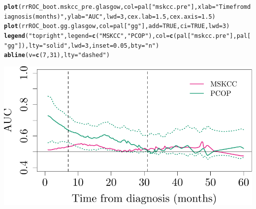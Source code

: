 \documentclass{article}\usepackage[]{graphicx}\usepackage[]{color}
\makeatletter
\def\maxwidth{ %
  \ifdim\Gin@nat@width>\linewidth
    \linewidth
  \else
    \Gin@nat@width
  \fi
}
\newcommand{\hlnum}[1]{\textcolor[rgb]{0.686,0.059,0.569}{#1}}%
\newcommand{\hlstr}[1]{\textcolor[rgb]{0.192,0.494,0.8}{#1}}%
\newcommand{\hlstd}[1]{\textcolor[rgb]{0.345,0.345,0.345}{#1}}%
\newcommand{\hlkwc}[1]{\textcolor[rgb]{0.333,0.667,0.333}{#1}}%
\newcommand{\hlkwd}[1]{\textcolor[rgb]{0.737,0.353,0.396}{\textbf{#1}}}%
\newenvironment{kframe}{%
 \def\at@end@of@kframe{}%
 \ifinner\ifhmode%
  \def\at@end@of@kframe{\end{minipage}}%
  \begin{minipage}{\columnwidth}%
 \fi\fi%
 \def\FrameCommand##1{\hskip\@totalleftmargin \hskip-\fboxsep
 \colorbox{shadecolor}{##1}\hskip-\fboxsep
     \hskip-\linewidth \hskip-\@totalleftmargin \hskip\columnwidth}%
 \MakeFramed {\advance\hsize-\width
   \@totalleftmargin\z@ \linewidth\hsize
   \@setminipage}}%
 {\par\unskip\endMakeFramed%
 \at@end@of@kframe}
\newenvironment{knitrout}{}{} %
\makeatother
\begin{document}
\begin{knitrout}
\color{fgcolor}\begin{kframe}
\begin{alltt}
\hlkwd{plot}\hlstd{(rrROC_boot.mskcc_pre.glasgow,} \hlkwc{col} \hlstd{= pal[}\hlstr{"mskcc.pre"}\hlstd{],} \hlkwc{xlab} \hlstd{=} \hlstr{"Time from diagnosis (months)"}\hlstd{,} \hlkwc{ylab} \hlstd{=} \hlstr{"AUC"}\hlstd{,} \hlkwc{lwd} \hlstd{=} \hlnum{3}\hlstd{,} \hlkwc{cex.lab} \hlstd{=} \hlnum{1.5}\hlstd{,} \hlkwc{cex.axis} \hlstd{=} \hlnum{1.5}\hlstd{)}
\hlkwd{plot}\hlstd{(rrROC_boot.gg.glasgow,} \hlkwc{col} \hlstd{= pal[}\hlstr{"gg"}\hlstd{],} \hlkwc{add} \hlstd{=} \hlnum{TRUE}\hlstd{,} \hlkwc{ci} \hlstd{=} \hlnum{TRUE}\hlstd{,} \hlkwc{lwd} \hlstd{=} \hlnum{3}\hlstd{)}
\hlkwd{legend}\hlstd{(}\hlstr{"topright"}\hlstd{,} \hlkwc{legend} \hlstd{=} \hlkwd{c}\hlstd{(}\hlstr{"MSKCC"}\hlstd{,} \hlstr{"PCOP"}\hlstd{),} \hlkwc{col} \hlstd{=} \hlkwd{c}\hlstd{(pal[}\hlstr{"mskcc.pre"}\hlstd{], pal[}\hlstr{"gg"}\hlstd{]),} \hlkwc{lty} \hlstd{=} \hlstr{"solid"}\hlstd{,} \hlkwc{lwd} \hlstd{=} \hlnum{3}\hlstd{,} \hlkwc{inset} \hlstd{=} \hlnum{0.05}\hlstd{,} \hlkwc{bty} \hlstd{=} \hlstr{"n"}\hlstd{)}
\hlkwd{abline}\hlstd{(}\hlkwc{v} \hlstd{=} \hlkwd{c}\hlstd{(}\hlnum{7}\hlstd{,} \hlnum{31}\hlstd{),} \hlkwc{lty} \hlstd{=} \hlstr{"dashed"}\hlstd{)}
\end{alltt}
\end{kframe}

{\centering \includegraphics[width=\maxwidth]{figure/07-risksetROC-plot-glasgow-1} 

}



\end{knitrout}
\end{document}
